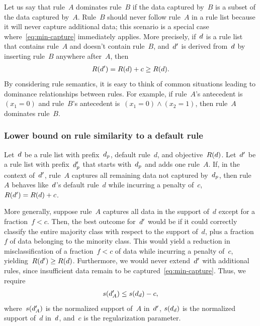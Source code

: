 Let us say that rule~$A$ dominates rule~$B$ if the data captured by~$B$ is a subset of the data captured by~$A$.
%
Rule~$B$ should never follow rule~$A$ in a rule list because it will never capture additional data;
this scenario is a special case where~\eqref{eq:min-capture} immediately applies.
%
More precisely, if~${d}$ is a rule list that contains rule~$A$ and doesn't contain rule~$B$,
and~${d}'$ is derived from~${d}$ by inserting rule~$B$ anywhere after~$A$, then
\begin{align}
\Obj(\RL') = \Obj(\RL) + c \ge \Obj(\RL).
\end{align}
By considering rule semantics, it is easy to think of common situations
leading to dominance relationships between rules.
%
For example, if rule~$A$'s antecedent is~${(x_1 = 0)}$ and rule~$B$'s
antecedent is~${(x_1 = 0) \wedge (x_2 = 1)}$, then rule~$A$ dominates rule~$B$.
%

\subsubsection{Lower bound on rule similarity to a default rule}

Let~${d}$ be a rule list with prefix~$d_p$, default rule~$d$, and objective~$R({d})$.
%
Let~${d}'$ be a rule list with prefix~$d_p'$ that starts with~$d_p$ and adds one rule~$A$.
%
If, in the context of~${d}'$, rule~$A$ captures all remaining data not captured by~$d_p$,
then rule~$A$ behaves like~${d}$'s default rule~$d$ while incurring a penalty of~$c$,
\ie ~${R({d}') = R({d}) + c}$.

More generally, suppose rule~$A$ captures all data in the support of~$d$
except for a fraction~${f < c}$.
%
Then, the best outcome for~${d}'$ would be if it could correctly classify
the entire majority class with respect to the support of~$d$,
plus a fraction~$f$ of data belonging to the minority class.
%
This would yield a reduction in misclassification of a fraction~${f < c}$
of data while incurring a penalty of~$c$, yielding~${R({d}') \ge R({d})}$.
%
Furthermore, we would never extend~${d}'$ with additional rules,
since insufficient data remain to be captured~\eqref{eq:min-capture}.
%
Thus, we require
\begin{align}
s(\RL'_A) \le s(\RL_d) - c,
\label{eq:max-capture}
\end{align}
where~$s({d}'_A)$ is the normalized support of~$A$ in~${d}'$,
$s({d}_d)$ is the normalized support of~$d$ in~${d}$,
and~$c$ is the regularization parameter.

